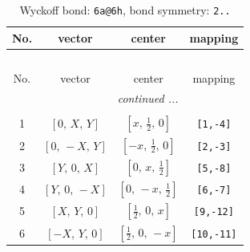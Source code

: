 \documentclass[fleqn,8pt]{jsarticle}
\begin{document}
\renewcommand{\arraystretch}{1.2}
\begin{longtable}{cccc}
\caption{Wyckoff bond: {\tt 6a@6h}, bond symmetry: {\tt 2..}}
 \\
 \hline \hline
No. & vector & center & mapping \\ \hline \endfirsthead

\multicolumn{3}{l}{\tablename\ \thetable{}} \\
 \hline \hline
No. & vector & center & mapping \\ \hline \endhead

 \hline \hline
\multicolumn{3}{r}{\footnotesize\it continued ...} \\ \endfoot

 \hline \hline
\multicolumn{3}{r}{} \\ \endlastfoot

1 & $\left[ 0,\, X,\, Y \right]$ & $\left[ x,\, \frac{1}{2},\, 0 \right]$ & {\tt [1,-4]} \\ \hline
2 & $\left[ 0,\, - X,\, Y \right]$ & $\left[ - x,\, \frac{1}{2},\, 0 \right]$ & {\tt [2,-3]} \\ \hline
3 & $\left[ Y,\, 0,\, X \right]$ & $\left[ 0,\, x,\, \frac{1}{2} \right]$ & {\tt [5,-8]} \\ \hline
4 & $\left[ Y,\, 0,\, - X \right]$ & $\left[ 0,\, - x,\, \frac{1}{2} \right]$ & {\tt [6,-7]} \\ \hline
5 & $\left[ X,\, Y,\, 0 \right]$ & $\left[ \frac{1}{2},\, 0,\, x \right]$ & {\tt [9,-12]} \\ \hline
6 & $\left[ - X,\, Y,\, 0 \right]$ & $\left[ \frac{1}{2},\, 0,\, - x \right]$ & {\tt [10,-11]} \\
\end{longtable}
\renewcommand{\arraystretch}{1.2}
\end{document}
